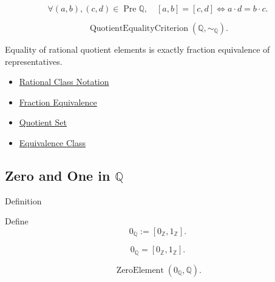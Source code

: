 \begin{remark*}
\[
\forall (a,b),(c,d)\in\operatorname{Pre}\mathbb{Q},\quad
[a,b]=[c,d]\Longleftrightarrow a\cdot d=b\cdot c.
\]
\end{remark*}

\begin{remark*}
\[
\operatorname{QuotientEqualityCriterion}(\mathbb{Q},\sim_{\mathbb{Q}}).
\]
\end{remark*}

\begin{remark*}[Interpretation]
Equality of rational quotient elements is exactly fraction equivalence of
representatives.
\end{remark*}

\begin{dependencies}
\begin{itemize}
  \item \hyperref[def:rational-class-notation]{Rational Class Notation}
  \item \hyperref[def:fraction-equivalence]{Fraction Equivalence}
  \item \hyperref[def:quotient-set]{Quotient Set}
  \item \hyperref[def:equiv-class]{Equivalence Class}
\end{itemize}
\end{dependencies}

\subsection*{\texorpdfstring{Zero and One in $\mathbb{Q}$}{Zero and One in Q}}

\begin{definitionbox}{Definition}
\begin{definition}
\label{def:zero-in-q}
Define
\[
0_{\mathbb{Q}}:=[0_{\mathbb{Z}},1_{\mathbb{Z}}].
\]
\end{definition}
\end{definitionbox}

\begin{remark*}
\[
0_{\mathbb{Q}}=[0_{\mathbb{Z}},1_{\mathbb{Z}}].
\]
\end{remark*}

\begin{remark*}
\[
\operatorname{ZeroElement}(0_{\mathbb{Q}},\mathbb{Q}).
\]
\end{remark*}


